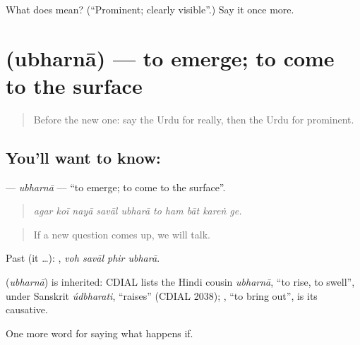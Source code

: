 \begin{tcolorbox}[breakable,colback=teal!4,colframe=teal!35!black,title={Before you move on}]
What does  mean? (\textquotedblleft{}Prominent; clearly visible\textquotedblright{}.) Say it once more.
\end{tcolorbox}
\section[\texorpdfstring{\ur{ابھرنا} (ubharnā)}{ابھرنا (ubharnā)}]{ (ubharnā) — to emerge; to come to the surface}

\label{lesson:UR-C364-ubharna-emerge}



\begin{quote}
Before the new one: say the Urdu for really, then the Urdu for prominent.
\end{quote}

\subsection*{You'll want to know: }
\textbf{} — \emph{ubharnā} — \textquotedblleft{}to emerge; to come to the surface\textquotedblright{}.

\begin{quote}
         
\end{quote}

\begin{quote}
\emph{agar koī nayā savāl ubharā to ham bāt kareṅ ge.}
\end{quote}

\begin{quote}
If a new question comes up, we will talk.
\end{quote}

Past (it …):    , \emph{voh savāl phir ubharā}.

\begin{cousinweb}
\textbf{} (\emph{ubharnā}) is inherited: CDIAL lists the Hindi cousin \emph{ubharnā}, \textquotedblleft{}to rise, to swell\textquotedblright{}, under Sanskrit \emph{údbharati}, \textquotedblleft{}raises\textquotedblright{} (CDIAL 2038); \textbf{}, \textquotedblleft{}to bring out\textquotedblright{}, is its causative.
\end{cousinweb}

\begin{grammarlens}[title={What you've built}]
One more word for saying what happens if.
\end{grammarlens}

